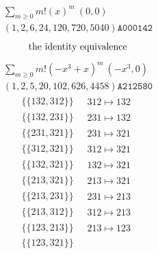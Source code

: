\allowdisplaybreaks
\begin{scriptsize}
$$
\begin{matrix}
\sum_{m \geq 0} m! \left(
x
\right)^m
\ 
\left(0, 0\right)
\\
\left(1, 2, 6, 24, 120, 720, 5040\right)
\texttt{A000142}
\end{matrix}
$$
\begin{align}
\textnormal{the identity equivalence}
\end{align}
$$
\begin{matrix}
\sum_{m \geq 0} m! \left(
-x^{3} + x
\right)^m
\ 
\left(-x^{3}, 0\right)
\\
\left(1, 2, 5, 20, 102, 626, 4458\right)
\texttt{A212580}
\end{matrix}
$$
\begin{align}
\{\{132, 312\}\}
\ 
&
\begin{matrix}
312 \mapsto 132
\end{matrix}
\\
\{\{132, 231\}\}
\ 
&
\begin{matrix}
231 \mapsto 132
\end{matrix}
\\
\{\{231, 321\}\}
\ 
&
\begin{matrix}
231 \mapsto 321
\end{matrix}
\\
\{\{312, 321\}\}
\ 
&
\begin{matrix}
312 \mapsto 321
\end{matrix}
\\
\{\{132, 321\}\}
\ 
&
\begin{matrix}
132 \mapsto 321
\end{matrix}
\\
\{\{213, 321\}\}
\ 
&
\begin{matrix}
213 \mapsto 321
\end{matrix}
\\
\{\{213, 231\}\}
\ 
&
\begin{matrix}
231 \mapsto 213
\end{matrix}
\\
\{\{213, 312\}\}
\ 
&
\begin{matrix}
312 \mapsto 213
\end{matrix}
\\
\{\{123, 213\}\}
\ 
&
\begin{matrix}
213 \mapsto 123
\end{matrix}
\\
\{\{123, 321\}\}
\ 
&
\begin{matrix}

\end{matrix}
\end{align}
\end{scriptsize}
